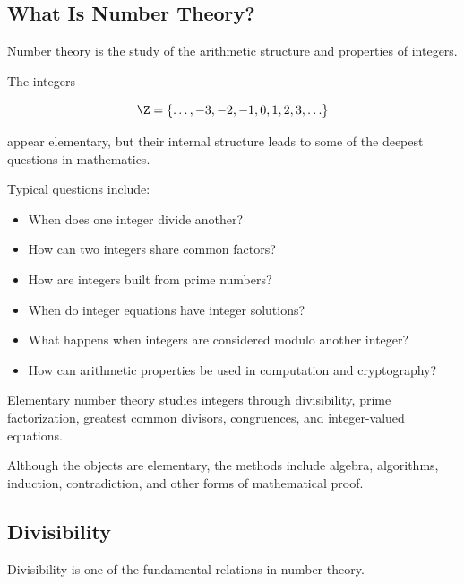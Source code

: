 \subsection{What Is Number Theory?}
\label{subsec:what-is-number-theory}

Number theory is the study of the arithmetic structure and properties of
integers.

The integers

\[ \Z=\{\ldots,-3,-2,-1,0,1,2,3,\ldots\} \]

appear elementary, but their internal structure leads to some of the deepest
questions in mathematics.

Typical questions include:

\begin{itemize}
    \item When does one integer divide another?
    \item How can two integers share common factors?
    \item How are integers built from prime numbers?
    \item When do integer equations have integer solutions?
    \item What happens when integers are considered modulo another integer?
    \item How can arithmetic properties be used in computation and cryptography?
\end{itemize}

\begin{conceptbox}
Elementary number theory studies integers through divisibility, prime
factorization, greatest common divisors, congruences, and integer-valued
equations.

Although the objects are elementary, the methods include algebra,
algorithms, induction, contradiction, and other forms of mathematical proof.
\end{conceptbox}

\subsection{Divisibility}
\label{subsec:number-theory-divisibility}

Divisibility is one of the fundamental relations in number theory.

